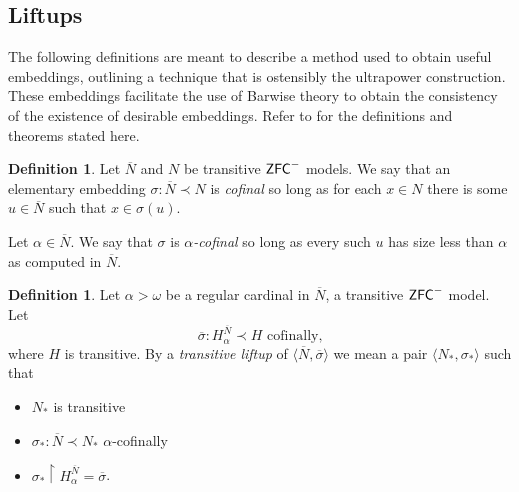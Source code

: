 \documentclass{amsart}
\theoremstyle{definition}
\newtheorem{definition}[theorem]{Definition}
\theoremstyle{remark}
\newcommand{\N}{{\overline{N}}}
\newcommand{\ZFC}{\textup{\ensuremath{\textsf{ZFC}}}}
\begin{document}
\subsection{Liftups}
\label{subsec:Liftups}
The following definitions are meant to describe a method used to obtain useful embeddings, outlining a technique that is ostensibly the ultrapower construction. These embeddings facilitate the use of Barwise theory to obtain the consistency of the existence of desirable embeddings. Refer to \cite[Chapter 1]{Jensen:2012fr} for the definitions and theorems stated here.

\begin{definition} Let $\N$ and $N$ be transitive $\ZFC^-$ models. We say that an elementary embedding $\sigma: \N \prec N$ is \emph{cofinal} so long as for each $x \in N$ there is some $u \in \N$ such that $x \in \sigma(u)$. 

Let $\alpha \in \N$. We say that $\sigma$ is \emph{$\alpha$-cofinal} so long as every such $u$ has size less than $\alpha$ as computed in $\N$. \end{definition}
	
\begin{definition} Let $\alpha > \omega$ be a regular cardinal in $\N$, a transitive $\ZFC^-$ model. Let 
	$$\overline \sigma: H^{\N}_\alpha \prec H \text{ cofinally,}$$ where $H$ is transitive. By a \emph{transitive liftup} of $\langle \N, \overline \sigma \rangle$ we mean a pair $\langle N_* , \sigma_* \rangle$ such that 
\begin{itemize} 
	\item $N_*$ is transitive
	\item $\sigma_*:\N \prec N_*$ $\alpha$-cofinally
	\item $\sigma_* \upharpoonright H_{\alpha}^{\N}= \overline \sigma$. \qedhere
\end{itemize}	
\end{definition}
\end{document}
